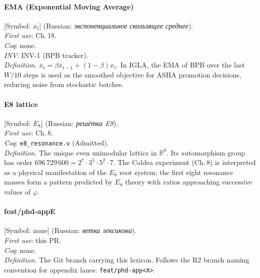 \paragraph*{\textmd{\textbf{EMA (Exponential Moving Average)}}}
\label{entry:ema}
[Symbol: $\overline{x}_t$] (Russian: \textit{экспоненциальное скользящее среднее}).\\
\textit{First use}: Ch.\,18.\\
\textit{Coq}: none.\\
\textit{INV}: INV-1 (BPB tracker).\\
\textit{Definition.}
$\overline{x}_t = \beta \overline{x}_{t-1} + (1-\beta) x_t$.
In IGLA, the EMA of BPB over the last $W/10$ steps is used as
the smoothed objective for ASHA promotion decisions, reducing
noise from stochastic batches.

\paragraph*{\textmd{\textbf{E8 lattice}}}
\label{entry:e8}
[Symbol: $E_8$] (Russian: \textit{решётка E8}).\\
\textit{First use}: Ch.\,8.\\
\textit{Coq}: \texttt{e8\_resonance.v} (Admitted).\\
\textit{Definition.}
The unique even unimodular lattice in $\mathbb{R}^8$.
Its automorphism group has order $696\,729\,600 = 2^7 \cdot 3^5 \cdot 5^2 \cdot 7$.
The Coldea experiment (Ch.\,8) is interpreted as a physical
manifestation of the $E_8$ root system; the first eight resonance
masses form a pattern predicted by $E_8$ theory with ratios approaching
successive values of $\varphi$.

\paragraph*{\textmd{\textbf{feat/phd-appE}}}
\label{entry:branch-appe}
[Symbol: none] (Russian: \textit{ветка лексикона}).\\
\textit{First use}: this PR.\\
\textit{Coq}: none.\\
\textit{Definition.}
The Git branch carrying this lexicon.
Follows the R2 branch naming convention for appendix lanes:
\texttt{feat/phd-app<X>}.

